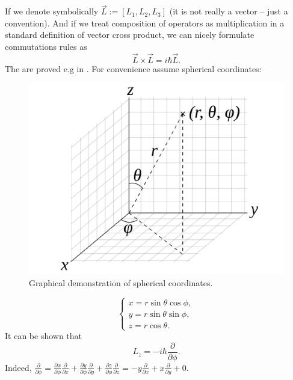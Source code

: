 \documentclass[main.tex]{subfiles}
\begin{document}
If we denote symbolically $\vec{L} := [L_1, L_2, L_3]$ (it is not really a vector -- just a convention). And if we treat composition of operators as multiplication in a standard definition of vector cross product, we can nicely formulate commutations rules as
\begin{equation}
\vec{L}\times \vec{L} = i\hbar \vec{L}.
\end{equation}
The are proved e.g in \cite[see][4.8 Angular-Momentum Operators]{walter-greiner2001}.
For convenience assume spherical coordinates:
\begin{figure}[H]
\centering
\includegraphics[scale=0.5]{figs/Spherical}
\caption{Graphical demonstration of spherical coordinates.}
\label{fig:hoop}
\end{figure}
\begin{equation}
\begin{cases}
x = r\sin\theta \cos\phi,\\
y = r\sin\theta \sin\phi,\\
z = r\cos\theta.
\end{cases}
\end{equation}
It can be shown that
\begin{equation}
\label{spherical_z_anguar}
\boxed{
L_z = -i\hbar\frac{\partial}{\partial \phi}.
}
\end{equation}
Indeed, $\frac{\partial}{\partial \phi}
=\frac{\partial x}{\partial\phi}\frac{\partial}{\partial x}
+\frac{\partial y}{\partial\phi}\frac{\partial}{\partial y}
+\frac{\partial z}{\partial\phi}\frac{\partial}{\partial z}
= -y\frac{\partial}{\partial x} + x\frac{\partial}{\partial y} 
+ 0
$.
\end{document}
